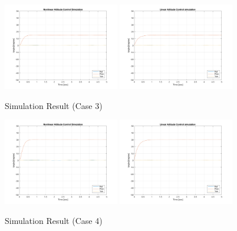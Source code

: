 \begin{figure}
    \centering
    \includegraphics[width=0.45\textwidth]{graphics/theta_03_non.png}
    \includegraphics[width=0.45\textwidth]{graphics/theta_03_pid.png}
    \caption{Simulation Result (Case 3)}
    \label{fig:sim_3}
\end{figure}

\begin{figure}
    \centering
    \includegraphics[width=0.45\textwidth]{graphics/theta_05_non.png}
    \includegraphics[width=0.45\textwidth]{graphics/theta_05_pid.png}
    \caption{Simulation Result (Case 4)}
    \label{fig:sim_4}
\end{figure}

